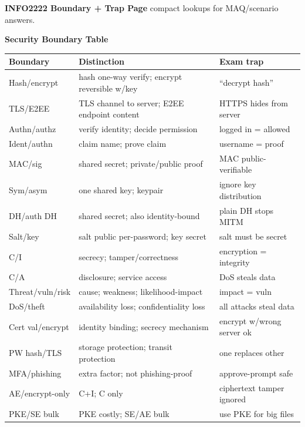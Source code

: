 \documentclass[8pt]{extarticle}
\newcommand{\h}[1]{\vspace{1pt}\textbf{#1}\par}
\begin{document}
\newpage
\begin{center}
\textbf{INFO2222 Boundary + Trap Page} \quad compact lookups for MAQ/scenario answers.
\end{center}
\vspace{-5pt}
\begin{multicols*}{5}

\h{Security Boundary Table}
\begin{tabularx}{\linewidth}{@{}lYY@{}}
\toprule
Boundary & Distinction & Exam trap\\ \midrule
Hash/encrypt & hash one-way verify; encrypt reversible w/key & ``decrypt hash''\\
TLS/E2EE & TLS channel to server; E2EE endpoint content & HTTPS hides from server\\
Authn/authz & verify identity; decide permission & logged in = allowed\\
Ident/authn & claim name; prove claim & username = proof\\
MAC/sig & shared secret; private/public proof & MAC public-verifiable\\
Sym/asym & one shared key; keypair & ignore key distribution\\
DH/auth DH & shared secret; also identity-bound & plain DH stops MITM\\
Salt/key & salt public per-password; key secret & salt must be secret\\
C/I & secrecy; tamper/correctness & encryption = integrity\\
C/A & disclosure; service access & DoS steals data\\
Threat/vuln/risk & cause; weakness; likelihood-impact & impact = vuln\\
DoS/theft & availability loss; confidentiality loss & all attacks steal data\\
Cert val/encrypt & identity binding; secrecy mechanism & encrypt w/wrong server ok\\
PW hash/TLS & storage protection; transit protection & one replaces other\\
MFA/phishing & extra factor; not phishing-proof & approve-prompt safe\\
AE/encrypt-only & C+I; C only & ciphertext tamper ignored\\
PKE/SE bulk & PKE costly; SE/AE bulk & use PKE for big files\\
\bottomrule
\end{tabularx}


\end{multicols*}
\end{document}
